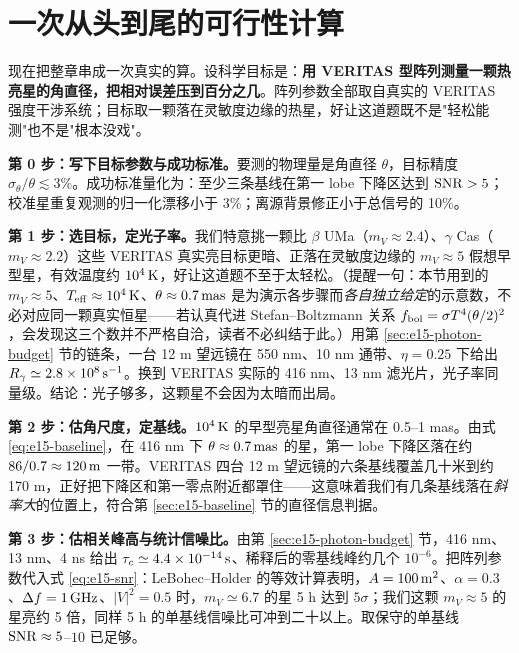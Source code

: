 \section{一次从头到尾的可行性计算}
\label{sec:e15-worked}

现在把整章串成一次真实的算。设科学目标是：\textbf{用 VERITAS 型阵列测量一颗热亮星的角直径，把相对误差压到百分之几}。阵列参数全部取自真实的 VERITAS 强度干涉系统；目标取一颗落在灵敏度边缘的热星，好让这道题既不是"轻松能测"也不是"根本没戏"。

\textbf{第 0 步：写下目标参数与成功标准。}要测的物理量是角直径 \(\theta\)，目标精度 \(\sigma_\theta/\theta\lesssim3\%\)。成功标准量化为：至少三条基线在第一 lobe 下降区达到 \({\rm SNR}>5\)；校准星重复观测的归一化漂移小于 3\%；离源背景修正小于总信号的 10\%。

\textbf{第 1 步：选目标，定光子率。}我们特意挑一颗比 \(\beta\) UMa（\(m_V\approx2.4\)）、\(\gamma\) Cas（\(m_V\approx2.2\)）这些 VERITAS 真实亮目标更暗、正落在灵敏度边缘的 \(m_V\approx5\) 假想早型星，有效温度约 \(10^4\,{\rm K}\)，好让这道题不至于太轻松。（提醒一句：本节用到的 \(m_V\approx5\)、\(T_{\rm eff}\approx10^4\,{\rm K}\)、\(\theta\approx0.7\,{\rm mas}\) 是为演示各步骤而\emph{各自独立给定}的示意数，不必对应同一颗真实恒星——若认真代进 Stefan--Boltzmann 关系 \(f_{\rm bol}=\sigma T^4(\theta/2)^2\)，会发现这三个数并不严格自洽，读者不必纠结于此。）用第 \ref{sec:e15-photon-budget} 节的链条，一台 12 m 望远镜在 550 nm、10 nm 通带、\(\eta=0.25\) 下给出 \(R_\gamma\simeq2.8\times10^8\,{\rm s^{-1}}\)。换到 VERITAS 实际的 416 nm、13 nm 滤光片，光子率同量级。结论：光子够多，这颗星不会因为太暗而出局。

\textbf{第 2 步：估角尺度，定基线。}\(10^4\,{\rm K}\) 的早型亮星角直径通常在 0.5--1 mas。由式 \eqref{eq:e15-baseline}，在 416 nm 下 \(\theta\approx0.7\,{\rm mas}\) 的星，第一 lobe 下降区落在约 \(86/0.7\approx120\,{\rm m}\) 一带。VERITAS 四台 12 m 望远镜的六条基线覆盖几十米到约 170 m，正好把下降区和第一零点附近都罩住——这意味着我们有几条基线落在\emph{斜率大}的位置上，符合第 \ref{sec:e15-baseline} 节的直径信息判据。

\textbf{第 3 步：估相关峰高与统计信噪比。}由第 \ref{sec:e15-photon-budget} 节，416 nm、13 nm、4 ns 给出 \(\tau_c\simeq4.4\times10^{-14}\,{\rm s}\)、稀释后的零基线峰约几个 \(10^{-6}\)。把阵列参数代入式 \eqref{eq:e15-snr}：LeBohec--Holder 的等效计算表明，\(A=100\,{\rm m^2}\)、\(\alpha=0.3\)、\(\Delta f=1\,{\rm GHz}\)、\(|V|^2=0.5\) 时，\(m_V\simeq6.7\) 的星 5 h 达到 \(5\sigma\)；我们这颗 \(m_V\approx5\) 的星亮约 5 倍，同样 5 h 的单基线信噪比可冲到二十以上。取保守的单基线 \({\rm SNR}\approx5\)--\(10\) 已足够。

